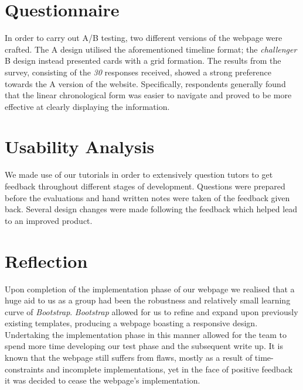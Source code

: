 \documentclass[a4paper, notoc]{tufte-handout}
\begin{document}
\section{Questionnaire}\label{survey-monkey-questionnaire-and-analysis}

In order to carry out A/B testing, two different versions of the webpage were crafted. The A design utilised the aforementioned timeline format; the \textit{challenger} B design instead presented cards with a grid formation. The results from the survey, consisting of the \emph{30} responses received, showed a strong preference towards the A version of the website. Specifically, respondents generally found that the linear chronological form was easier to navigate and proved to be more effective at clearly displaying the information.

\section{Usability Analysis}


We made use of our tutorials in order to extensively question tutors to get feedback throughout different stages of development. Questions were prepared before the evaluations and hand written notes were taken of the feedback given back. Several design changes were made following the feedback which helped lead to an improved product.

\section{Reflection}


Upon completion of the implementation phase of our webpage we realised that a huge aid to us as a group had been the robustness and relatively small learning curve of \textit{Bootstrap}. \textit{Bootstrap} allowed for us to refine and expand upon previously existing templates, producing a webpage boasting a responsive design. Undertaking the implementation phase in this manner allowed for the team to spend more time developing our test phase and the subsequent write up. It is known that the webpage still suffers from flaws, mostly as a result of time-constraints and incomplete implementations, yet in the face of positive feedback it was decided to cease the webpage's implementation.
\end{document}
